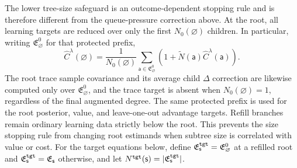 \documentclass[12pt, a4paper]{article}
\begin{document}
The lower tree-size safeguard is an outcome-dependent stopping rule and is
therefore different from the queue-pressure correction above. At the root,
all learning targets are reduced over only the first
$N_0(\varnothing)$ children. In particular, writing
$\mathfrak E^0_{\varnothing}$ for that protected prefix,
\[
  \widehat C^\lambda(\varnothing)
  =\frac1{N_0(\varnothing)}
    \sum_{\mathsf a\in\mathfrak E^0_{\varnothing}}
    \left(1+\widetilde N(\mathsf a)\widehat C^\lambda(\mathsf a)\right).
\]
The root trace sample covariance and its average child $\Delta$ correction are
likewise computed only over $\mathfrak E^0_{\varnothing}$, and the trace target
is absent when $N_0(\varnothing)=1$, regardless of the final augmented degree.
The same protected prefix is used for the root posterior, value, and
leave-one-out advantage targets. Refill branches remain ordinary learning data
strictly below the root. This prevents the size stopping rule from changing
root estimands when subtree size is correlated with value or cost.
For the target equations below, define
$\mathfrak E^{\tt tgt}_{\mathsf s}=\mathfrak E^0_{\varnothing}$ at a refilled
root and $\mathfrak E^{\tt tgt}_{\mathsf s}=\mathfrak E_{\mathsf s}$ otherwise,
and let $N^{\tt tgt}(\mathsf s)=|\mathfrak E^{\tt tgt}_{\mathsf s}|$.
\end{document}
